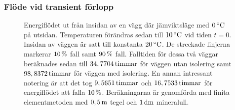 \subsubsection{Flöde vid transient förlopp}


\begin{figure}[hpbt]
\centering

\vspace{5mm}
\caption{Energiflödet ut från insidan av en vägg där jämviktsläge med
$\unit[0]{^\circ C}$ på utsidan. Temperaturen förändras sedan
till $\unit[10]{^\circ C}$ vid tiden $t=0$. Insidan av väggen är satt till
konstanta $\unit[20]{^\circ C}$. De streckade linjerna markerar $\unit[10]{\%}$
fall samt $\unit[90]{\%}$ fall. Falltiden för dessa två väggar beräknades sedan
till $\unit[34,7704]{ timmar}$ för väggen utan isolering samt
$\unit[98,8372]{ timmar}$ för väggen med isolering. En annan intressant notering
är att det tog $\unit[9,5651]{ timmar}$ och $\unit[16,7533]{ timmar}$ för
energiflödet att falla $\unit[10]{\%}$. Beräkningarna är genomförda med finita
elementmetoden med $\unit[0,5]{m}$ tegel och $\unit[1]{dm}$ mineralull.}
\end{figure}
